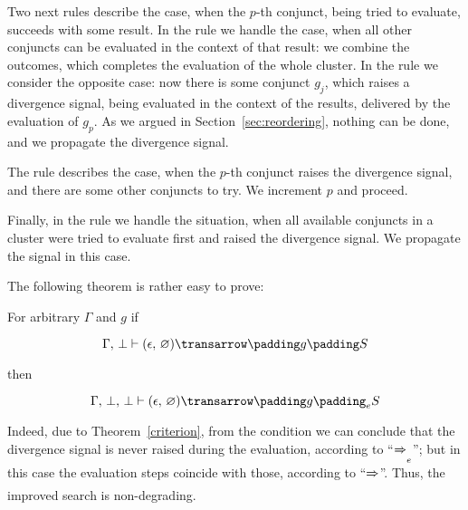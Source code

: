 Two next rules describe the case, when the $p$-th conjunct, being tried to evaluate, succeeds with some result. In the rule
 we handle the case, when all other conjuncts can be evaluated in the context of that result: we
combine the outcomes, which completes the evaluation of the whole cluster. In the rule  we consider
the opposite case: now there is some conjunct $g_j$, which raises a divergence signal, being evaluated in the context of
the results, delivered by the evaluation of $g_p$. As we argued in Section~\ref{sec:reordering}, nothing can be done, and we
propagate the divergence signal.

The rule  describes the case, when the $p$-th conjunct raises the divergence signal, and there are
some other conjuncts to try. We increment $p$ and proceed.

Finally, in the rule  we handle the situation, when all available conjuncts in a cluster were tried to
evaluate first and raised the divergence signal. We propagate the signal in this case.

The following theorem is rather easy to prove:

\begin{theorem} For arbitrary $\Gamma$ and $g$ if

  \[{\setsubarrow{}\otrans{\Gamma,\,\bot}{(\epsilon,\,\emptyset)}{g}{S}}\]

  then
  
  \[{\setsubarrow{_e}\otrans{\Gamma,\,\bot,\,\bot}{(\epsilon,\,\emptyset)}{g}{S}}\]

\end{theorem}

Indeed, due to Theorem~\ref{criterion}, from the condition we can conclude that the divergence signal is
never raised during the evaluation, according to ``$\xRightarrow{}_e$''; but in this case the evaluation
steps coincide with those, according to ``$\xRightarrow{}$''. Thus, the improved search is non-degrading.
